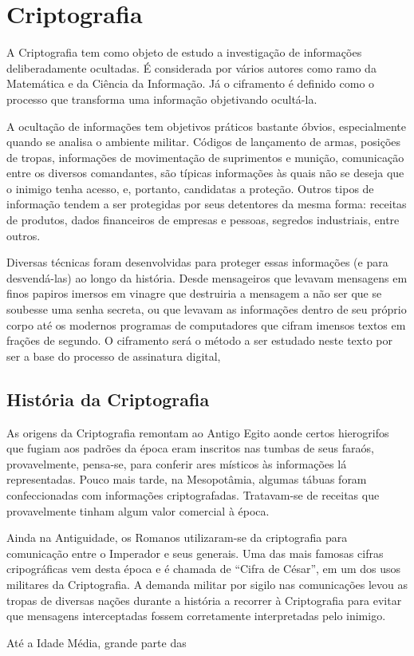\chapter{Criptografia} %
\label{cha:criptografia}
A Criptografia tem como objeto de estudo a investigação de informações deliberadamente ocultadas. É considerada por vários autores como ramo da Matemática e da Ciência da Informação. Já o ciframento é definido como o processo que transforma uma informação objetivando ocultá-la. \par

A ocultação de informações tem objetivos práticos bastante óbvios, especialmente quando se analisa o ambiente militar. Códigos de lançamento de armas, posições de tropas, informações de movimentação de suprimentos e munição, comunicação entre os diversos comandantes, são típicas informações às quais não se deseja que o inimigo tenha acesso, e, portanto, candidatas a proteção. Outros tipos de informação tendem a ser protegidas por seus detentores da mesma forma: receitas de produtos, dados financeiros de empresas e pessoas, segredos industriais, entre outros. \par

Diversas técnicas foram desenvolvidas para proteger essas informações (e para desvendá-las) ao longo da história. Desde mensageiros que levavam mensagens em finos papiros imersos em vinagre que destruiria a mensagem a não ser que se soubesse uma senha secreta, ou que levavam as informações dentro de seu próprio corpo até os modernos programas de computadores que cifram imensos textos em frações de segundo. O ciframento será o método a ser estudado neste texto por ser a base do processo de assinatura digital, 



\section{História da Criptografia} %
\label{sub:historia_da_criptografia}

As origens da Criptografia remontam ao Antigo Egito aonde certos hierogrifos que fugiam aos padrões da época eram inscritos nas tumbas de seus faraós, provavelmente, pensa-se, para conferir ares místicos às informações lá representadas. Pouco mais tarde, na Mesopotâmia, algumas tábuas foram confeccionadas com informações criptografadas. Tratavam-se de receitas que provavelmente tinham algum valor comercial à época. \par

Ainda na Antiguidade, os Romanos utilizaram-se da criptografia para comunicação entre o Imperador e seus generais. Uma das mais famosas cifras cripográficas vem desta época e é chamada de ``Cifra de César'', em um dos usos militares da Criptografia. A demanda militar por sigilo nas comunicações levou as tropas de diversas nações durante a história a recorrer à Criptografia para evitar que mensagens interceptadas fossem corretamente interpretadas pelo inimigo.\par

Até a Idade Média, grande parte das 




